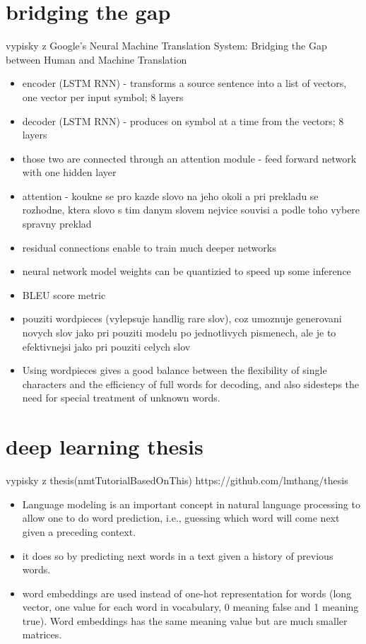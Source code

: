 \section{bridging the gap}
vypisky z Google’s Neural Machine Translation System: Bridging the Gap
between Human and Machine Translation
\begin{itemize}
  \item encoder (LSTM RNN) - transforms a source sentence into a list of vectors, one vector per input symbol; 8 layers
  \item decoder (LSTM RNN) - produces on symbol at a time from the vectors; 8 layers
  \item those two are connected through an attention module - feed forward network with one hidden layer
  \item attention - koukne se pro kazde slovo na jeho okoli a pri prekladu se rozhodne, ktera slovo s tim danym slovem nejvice souvisi a podle toho vybere spravny preklad
  \item residual connections enable to train much deeper networks
  \item neural network model weights can be quantizied to speed up some inference
  \item BLEU score metric
  \item pouziti wordpieces (vylepsuje handlig rare slov), coz umoznuje generovani novych slov jako pri pouziti modelu po jednotlivych pismenech, ale je to efektivnejsi jako pri pouziti celych slov
  \item Using wordpieces gives a good balance between the flexibility of single characters and the efficiency of full words for decoding, and also sidesteps the need for special treatment of unknown words.
\end{itemize}

\section{deep learning thesis}
vypisky z thesis(nmtTutorialBasedOnThis) https://github.com/lmthang/thesis
\begin{itemize}
  \item Language modeling is an important concept in natural language processing to allow one to do word prediction, i.e., guessing which word will come next given a preceding context.
  \item it does so by predicting next words in a text given a history of previous words.
  \item word embeddings are used instead of one-hot representation for words (long vector, one value for each word in vocabulary, 0 meaning false and 1 meaning true). Word embeddings has the same meaning value but are much smaller matrices.
\end{itemize}

